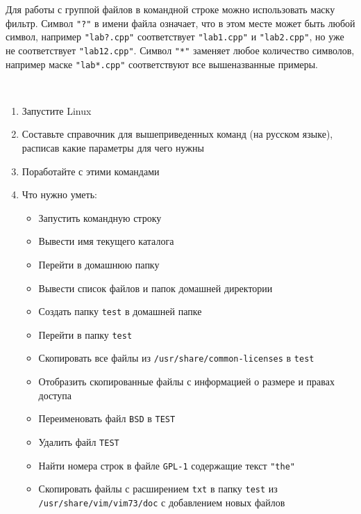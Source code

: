 \documentclass[a4paper,12pt]{article}
\begin{document}
    \begin{flushleft}
        Для работы с группой файлов в командной строке можно использовать маску фильтр. Символ \texttt{"?"} в имени файла означает, что в этом месте может быть любой символ, например \texttt{"lab?.cpp"} соответствует \texttt{"lab1.cpp"} и \texttt{"lab2.cpp"}, но уже не соответствует \texttt{"lab12.cpp"}. Символ \texttt{"*"} заменяет любое количество символов, например маске \texttt{"lab*.cpp"} соответствуют все вышеназванные примеры.
    \end{flushleft}

    \newpage

    \begin{flushleft}
         \\[0.5em]
        \begin{enumerate}
            \item Запустите Linux
            \item Составьте справочник для вышеприведенных команд (на русском языке), расписав какие параметры для чего нужны
            \item Поработайте с этими командами
            \item Что нужно уметь:
            \begin{itemize}
                \item Запустить командную строку
                \item Вывести имя текущего каталога
                \item Перейти в домашнюю папку
                \item Вывести список файлов и папок домашней директории
                \item Создать папку \texttt{test} в домашней папке
                \item Перейти в папку \texttt{test}
                \item Скопировать все файлы из \texttt{/usr/share/common-licenses} в \texttt{test}
                \item Отобразить скопированные файлы с информацией о размере и правах доступа
                \item Переименовать файл \texttt{BSD} в \texttt{TEST}
                \item Удалить файл \texttt{TEST}
                \item Найти номера строк в файле \texttt{GPL-1} содержащие текст \texttt{"the"}
                \item Скопировать файлы с расширением \texttt{txt} в папку \texttt{test} из \texttt{/usr/share/vim/vim73/doc} с добавлением новых файлов

\end{itemize}
\end{enumerate}
\end{flushleft}
\end{document}

